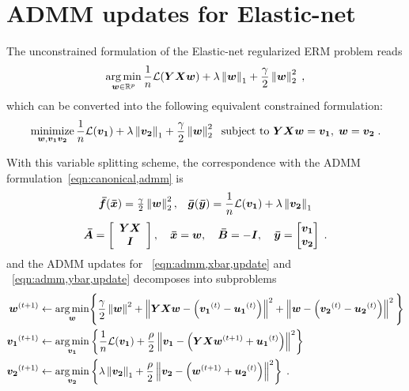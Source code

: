 \section{ADMM updates for Elastic-net}
\label{appendix,admm,enet}
The unconstrained formulation of the Elastic-net regularized ERM problem reads
\begin{equation}
	\operatorname*{arg\,min}_{{\bm{w}}\in\mathbb{R}^p} \frac{1}{n}\mathcal{L}({\bm{YXw}}) + \lambda\left\| {\bm{w}} \right\|_1 + \frac{\gamma}{2}\left\| {\bm{w}} \right\|^2_2 \;,
	\nonumber
\end{equation}
which can be converted into the following equivalent constrained formulation:
\begin{equation}
	\begin{array}{c}
		\dstyle\minimize{\w,\va \vb}
			\frac{1}{n}\Loss(\va)+\lambda\norm{\vb}_1+ \frac{\gamma}{2}\norm{\w}^2_2 \;
			\vspace{0.01\linewidth}
		\text{ subject to }  \YXw =\va, \; \w=\vb \;.
	\end{array}
	\label{eqn:splitting,enet}
\end{equation}
With this variable splitting scheme, the correspondence with the ADMM formulation~\eqref{eqn:canonical,admm} is
\begin{equation}
	\begin{array}{c}
		\fbar(\xbar)=\frac{\gamma}{2}\norm{\w}^2_2 , \;\;\;
		\gbar(\ybar)=\dstyle\frac{1}{n}\Loss(\va) + \lambda\norm{\vb}_1  
		\vspace{0.02\linewidth} \\
		\Abar = 	\ba{cc} 	\Y\X	 \\ \I \ea 	, \quad
		\xbar = \w, \quad
		\Bbar = 	-\I		, \quad
		\ybar = \bmat \va \\ \vb \emat \;.
		\end{array}
	\nonumber
\end{equation}
and the ADMM updates for \xbar~\eqref{eqn:admm,xbar,update} and \ybar~\eqref{eqn:admm,ybar,update} decomposes into subproblems
\begin{alignat}{1} 
	{\ensuremath{\bm{w}}}^{(t+1)} 	\leftarrow \operatorname*{arg\,min}_{{\bm{w}}}&
		 \Bigg\{ \frac{\gamma}{2}\left\| {\bm{w}} \right\|^2
		+ \left\| {\bm{Y}}{\bm{X}}{\bm{w}}-\left({\bm{v_1}}^{(t)}-{\bm{u_1}}^{(t)}\right) \right\|^2 
		+ \left\| {\bm{w}}-\left({\bm{v_2}}^{(t)}-{\bm{u_2}}^{(t)}\right) \right\|^2 \Bigg\} \nonumber \\
	{\bm{v_1}}^{(t+1)} \leftarrow \operatorname*{arg\,min}_{{\bm{v_1}}}
		& \left\{ \frac{1}{n}\mathcal{L}({\bm{v_1}}) + \frac{\rho}{2}\left\| {\bm{v_1}}-\left({\bm{Y}}{\bm{X}}{\bm{w}}^{(t+1)}+{\bm{u_1}}^{(t)}\right) \right\|^2 \right\}
			\nonumber \\
	{\bm{v_2}}^{(t+1)} \leftarrow \operatorname*{arg\,min}_{{\bm{v_2}}} 
		& \left\{\lambda\left\| {\bm{v_2}} \right\|_1 + \frac{\rho}{2}\left\| {\bm{v_2}}-\left({\bm{w}}^{(t+1)}+{\bm{u_2}}^{(t)}\right) \right\|^2 
			\nonumber\right\} \;.
\end{alignat}
